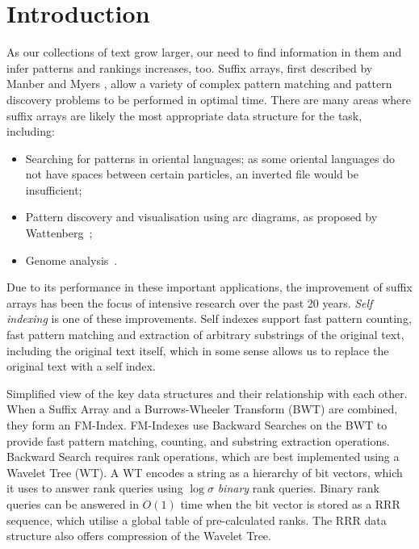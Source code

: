 \section{Introduction}

As our collections of text grow larger, our need to find information in them
and infer patterns and rankings increases, too. Suffix arrays, first
described by Manber and Myers \cite{manber1993}, allow a variety of complex 
pattern matching and pattern discovery problems to be performed in optimal time. 
There are many areas where suffix arrays are likely the most appropriate data 
structure for the task, including:

\begin{itemize}
\item
	Searching for patterns in oriental languages; as some oriental languages
    do not have spaces between certain particles, an inverted file would be
    insufficient;
\item
	Pattern discovery and visualisation using arc diagrams, as proposed by
    Wattenberg~\cite{arc:wattenberg2002};
\item
	Genome analysis~\cite{genome:abouelhoda2004, genome:flicek2009}.
\end{itemize}

Due to its performance in these important applications, the improvement of 
suffix arrays has been the focus of intensive research over the past 20 years. 
\emph{Self indexing} is one of these improvements. Self indexes support 
fast pattern counting, fast pattern matching and extraction of arbitrary 
substrings of the original text, including the original text itself, which in 
some sense allows us to replace the original text with a self index.

	{Simplified view of the key data structures and their relationship
	with each other. When a Suffix Array and a Burrows-Wheeler 
	Transform (BWT) are combined, they form an FM-Index. FM-Indexes use 
	Backward Searches on the BWT to provide fast pattern 
	matching, counting, and substring extraction operations. Backward
	Search requires rank operations, which are best implemented using
	a Wavelet Tree (WT). A WT encodes a string as a hierarchy of bit vectors, 
	which it uses to answer rank queries using $\log \sigma$ \emph{binary} rank 
	queries. Binary rank queries can be answered in $O(1)$ time when the bit 
	vector is stored as a RRR sequence, which utilise a global table of 
	pre-calculated ranks. The RRR data structure also offers compression of the 
	Wavelet Tree.}

